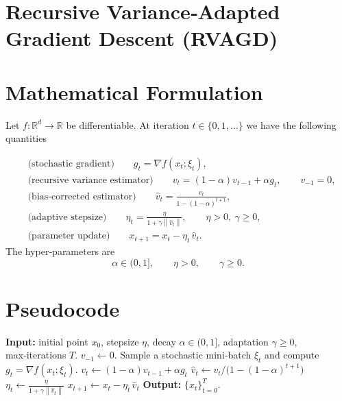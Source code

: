 \documentclass{article}
\newcommand{\norm}[1]{\left\|#1\right\|}
\begin{document}
\section*{Recursive Variance‑Adapted Gradient Descent (RVAGD)}

\section*{Mathematical Formulation}
Let $f:\mathbb{R}^{d}\to\mathbb{R}$ be differentiable.  
At iteration $t\in\{0,1,\dots\}$ we have the following quantities  

\begin{align}
    &\text{(stochastic gradient)}\qquad g_{t}= \nabla f(x_{t};\xi_{t}), \\
    &\text{(recursive variance estimator)}\qquad 
        v_{t}= (1-\alpha)v_{t-1}+ \alpha g_{t}, \qquad v_{-1}=0, \label{eq:vt}\\
    &\text{(bias‑corrected estimator)}\qquad 
        \hat v_{t}= \frac{v_{t}}{1-(1-\alpha)^{t+1}}, \label{eq:vtbias}\\
    &\text{(adaptive stepsize)}\qquad 
        \eta_{t}= \frac{\eta}{1+\gamma \norm{\hat v_{t}}}, \qquad 
        \eta>0,\ \gamma\ge 0, \label{eq:stepsize}\\
    &\text{(parameter update)}\qquad 
        x_{t+1}= x_{t}-\eta_{t}\,\hat v_{t}. \label{eq:update}
\end{align}
The hyper‑parameters are 
\[
\alpha\in(0,1],\qquad \eta>0,\qquad \gamma\ge 0 .
\]

\section*{Pseudocode}
\begin{algorithm}[H]
\caption{Recursive Variance‑Adapted Gradient Descent (RVAGD)}
\begin{algorithmic}[1]
\STATE \textbf{Input:} initial point $x_{0}$, stepsize $\eta$, decay $\alpha\in(0,1]$, adaptation $\gamma\ge0$, max‑iterations $T$.
\STATE $v_{-1}\gets 0$.
    \STATE Sample a stochastic mini‑batch $\xi_{t}$ and compute $g_{t}= \nabla f(x_{t};\xi_{t})$.
    \STATE $v_{t}\gets (1-\alpha)v_{t-1}+ \alpha g_{t}$ \hfill{}
    \STATE $\hat v_{t}\gets v_{t}/\bigl(1-(1-\alpha)^{t+1}\bigr)$ \hfill{}
    \STATE $\eta_{t}\gets \displaystyle\frac{\eta}{1+\gamma\norm{\hat v_{t}}}$ \hfill{}
    \STATE $x_{t+1}\gets x_{t}-\eta_{t}\,\hat v_{t}$ \hfill{}
\ENDFOR
\STATE \textbf{Output:} $\{x_{t}\}_{t=0}^{T}$.
\end{algorithmic}
\end{algorithm}
\end{document}
